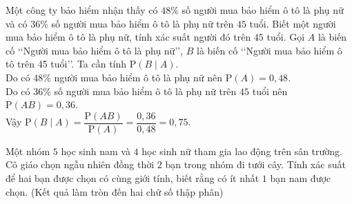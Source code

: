 \begin{bt}%

	Một công ty bảo hiểm nhận thấy có $48 \%$ số người mua bảo hiểm ô tô là phụ nữ và có $36 \%$ số người mua bảo hiểm ô tô là phụ nữ trên $45$ tuổi. Biết một người mua bảo hiểm ô tô là phụ nữ, tính xác suất người đó trên $45$ tuổi.
	\loigiai
	{
		Gọi $A$ là biến cố \lq\lq Người mua bảo hiểm ô tô là phụ nữ\rq\rq, $B$ là biến cố \lq\lq Người mua bảo hiểm ô tô trên 45 tuổi\rq\rq. Ta cần tính $\mathrm{P}(B \mid A)$.\\
		Do có $48 \%$ người mua bảo hiểm ô tô là phụ nữ nên $\mathrm{P}(A)=0{,}48$.\\
		Do có $36 \%$ số người mua bảo hiểm ô tô là phụ nữ trên $45$ tuổi nên $\mathrm{P}(A B)=0{,}36$.\\
		Vậy $\mathrm{P}(B \mid A)=\dfrac{\mathrm{P}(A B)}{\mathrm{P}(A)}=\dfrac{0{,}36}{0{,}48}=0{,}75$.  
	}
\end{bt}

\begin{bt}%

	Một nhóm $5$ học sinh nam và $4$ học sinh nữ tham gia lao động trên sân trường. Cô giáo chọn ngẫu nhiên đồng thời $2$ bạn trong nhóm đi tưới cây. Tính xác suất để hai bạn được chọn có cùng giới tính, biết rằng có ít nhất $1$ bạn nam được chọn.	(Kết quả làm tròn đến hai chữ số thập phân)
\end{bt}

